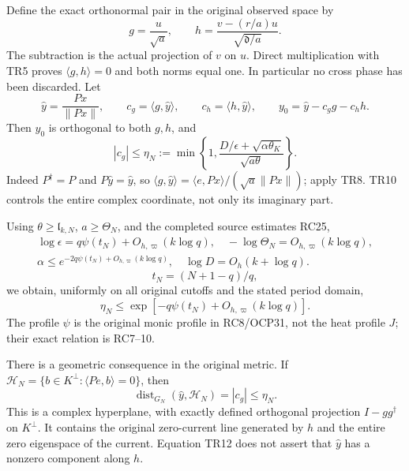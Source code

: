 \documentclass[10pt]{article}
\begin{document}
Define the exact orthonormal pair in the original observed space by \[
g=\frac{u}{\sqrt a},\qquad
h=\frac{v-(r/a)u}{\sqrt{\mathfrak d/a}}.
\tag{TR9}
\] The subtraction is the actual projection of \(v\) on \(u\). Direct multiplication with TR5 proves \(\langle g,h\rangle=0\) and both norms equal one. In particular no cross phase has been discarded. Let \[
\widehat y=\frac{Px}{\|Px\|},\qquad
c_g=\langle g,\widehat y\rangle,\qquad
c_h=\langle h,\widehat y\rangle,\qquad
y_0=\widehat y-c_gg-c_hh.
\] Then \(y_0\) is orthogonal to both \(g,h\), and \[
\boxed{|c_g|\le\eta_N:=
\min\left\{1,\frac{D/\epsilon+\sqrt{\alpha\theta_K}}{\sqrt{a\theta}}\right\}.}
\tag{TR10}
\] Indeed \(P^\dagger=P\) and \(P\widehat y=\widehat y\), so \(\langle g,\widehat y\rangle=\langle e,Px\rangle/(\sqrt a\|Px\|)\); apply TR8. TR10 controls the entire complex coordinate, not only its imaginary part.

Using \(\theta\ge\mathfrak l_{k,N}\), \(a\ge\Theta_N\), and the completed source estimates RC25, \[
\begin{gathered}
\log\epsilon=q\psi(t_N)+O_{h,\varpi}(k\log q),\quad
-\log\Theta_N=O_{h,\varpi}(k\log q),\\
\alpha\le e^{-2q\psi(t_N)+O_{h,\varpi}(k\log q)},\quad
\log D=O_h(k+\log q).
\end{gathered}
\] \[
t_N=(N+1-q)/q,
\] we obtain, uniformly on all original cutoffs and the stated period domain, \[
\boxed{\eta_N\le
\exp[-q\psi(t_N)+O_{h,\varpi}(k\log q)].}
\tag{TR11}
\] The profile \(\psi\) is the original monic profile in RC8/OCP31, not the heat profile \(J\); their exact relation is RC7--10.

There is a geometric consequence in the original metric. If \(\mathcal H_N=\{b\in K^\perp:\langle Pe,b\rangle=0\}\), then \[
\operatorname{dist}_{G_N}(\widehat y,\mathcal H_N)=|c_g|\le\eta_N.
\tag{TR12}
\] This is a complex hyperplane, with exactly defined orthogonal projection \(I-gg^\dagger\) on \(K^\perp\). It contains the original zero-current line generated by \(h\) and the entire zero eigenspace of the current. Equation TR12 does not assert that \(\widehat y\) has a nonzero component along \(h\).
\end{document}
